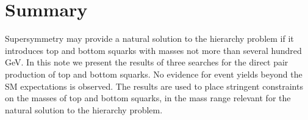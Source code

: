\section{Summary}
\label{sec:summary}

Supersymmetry may provide a natural solution to the hierarchy problem if it introduces top and bottom squarks with masses not more than several hundred GeV.
In this note we present the results of three searches for the direct pair production of top and bottom squarks. No evidence for event yields beyond
the SM expectations is observed. The results are used to place stringent constraints on the masses of top and bottom squarks, in the mass range relevant
for the natural solution to the hierarchy problem.
